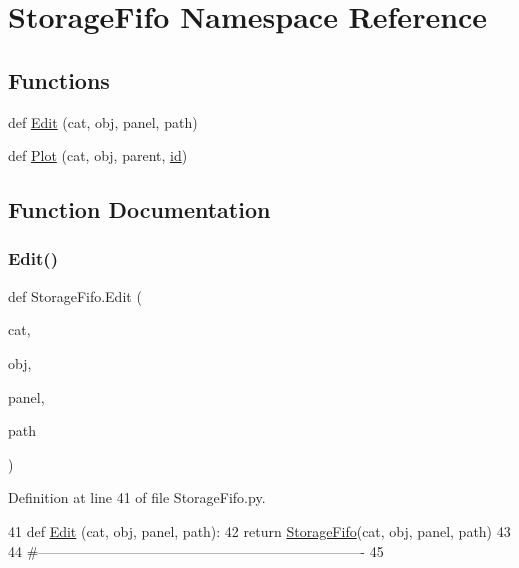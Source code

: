 \hypertarget{namespaceStorageFifo}{}\section{Storage\+Fifo Namespace Reference}
\label{namespaceStorageFifo}
\subsection*{Functions}
\begin{DoxyCompactItemize}
\item 
def \hyperlink{namespaceStorageFifo_add29dd32bd93fa653a45307b64d1d353}{Edit} (cat, obj, panel, path)
\item 
def \hyperlink{namespaceStorageFifo_a5b6e307d43478bad77c59ce8a33e0595}{Plot} (cat, obj, parent, \hyperlink{classObject_af99145335cc61ff6e2798ea17db009d2}{id})
\end{DoxyCompactItemize}


\subsection{Function Documentation}
\mbox{\label{namespaceStorageFifo_add29dd32bd93fa653a45307b64d1d353}} 
\subsubsection{\texorpdfstring{Edit()}{Edit()}}
{\footnotesize\ttfamily def Storage\+Fifo.\+Edit (\begin{DoxyParamCaption}\item[{}]{cat,  }\item[{}]{obj,  }\item[{}]{panel,  }\item[{}]{path }\end{DoxyParamCaption})}



Definition at line 41 of file Storage\+Fifo.\+py.


\begin{DoxyCode}
41 \textcolor{keyword}{def }\hyperlink{namespaceStorageFifo_add29dd32bd93fa653a45307b64d1d353}{Edit} (cat, obj, panel, path):
42     \textcolor{keywordflow}{return} \hyperlink{classStorageFifo}{StorageFifo}(cat, obj, panel, path)
43 
44 \textcolor{comment}{#----------------------------------------------------------------------}
45 
\end{DoxyCode}
\mbox{\label{namespaceStorageFifo_a5b6e307d43478bad77c59ce8a33e0595}} 

